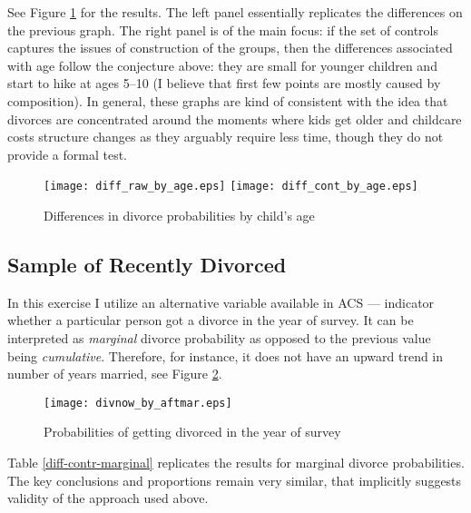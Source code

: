 \documentclass[12pt,letter]{article}
\begin{document}
See Figure \ref{pics-diff} for the results. The left panel essentially replicates the differences on the previous graph. The right panel is of the main focus: if the set of controls captures the issues of construction of the groups, then the differences associated with age follow the conjecture above: they are small for younger children and start to hike at ages 5--10 (I believe that first few points are mostly caused by composition). In general, these graphs are kind of consistent with the idea that divorces are concentrated around the moments where kids get older and childcare costs structure changes as they arguably require less time, though they do not provide a formal test.
\begin{figure}[h!]
\texttt{[image: diff\_raw\_by\_age.eps]}
\texttt{[image: diff\_cont\_by\_age.eps]}
\caption{Differences in divorce probabilities by child's age\label{pics-diff}}
\end{figure}

\subsection{Sample of Recently Divorced}
In this exercise I utilize an alternative variable available in ACS --- indicator whether a particular person got a divorce in the year of survey. It can be interpreted as \textit{marginal} divorce probability as opposed to the previous value being \emph{cumulative}. Therefore, for instance, it does not have an upward trend in number of years married, see Figure \ref{pic-now-aftmar}. 
\begin{figure}[h]
\centering
\texttt{[image: divnow\_by\_aftmar.eps]}
\caption{Probabilities of getting divorced in the year of survey\label{pic-now-aftmar}}
\end{figure}

Table \ref{diff-contr-marginal} replicates the results for marginal divorce probabilities. The key conclusions and proportions remain very similar, that implicitly suggests validity of the approach used above.
\end{document}
